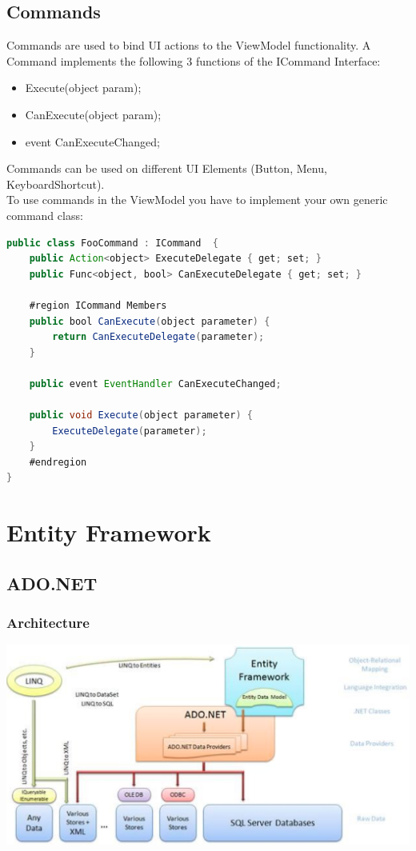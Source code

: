 \documentclass[10pt]{article}
\begin{document}
\subsection{Commands}
Commands are used to bind UI actions to the ViewModel functionality. A Command implements the following 3 functions of the ICommand Interface:
\begin{itemize}
	\item Execute(object param);
	\item CanExecute(object param);
	\item event CanExecuteChanged;
\end{itemize}
Commands can be used on different UI Elements (Button, Menu, KeyboardShortcut). \\
To use commands in the ViewModel you have to implement your own generic command class:
\begin{lstlisting}[language=Java, caption=Commands:, style=JavaStyle]
public class FooCommand : ICommand  {
	public Action<object> ExecuteDelegate { get; set; }
	public Func<object, bool> CanExecuteDelegate { get; set; }
	
	#region ICommand Members
	public bool CanExecute(object parameter) {
		return CanExecuteDelegate(parameter);
	}

	public event EventHandler CanExecuteChanged;
	
	public void Execute(object parameter) {
		ExecuteDelegate(parameter);
	}
	#endregion
}
\end{lstlisting}

\pagebreak
\section{Entity Framework}
\subsection{ADO.NET}
\subsubsection{Architecture}
\begin{center}
	\includegraphics[scale=0.3]{ado_architecture.png}
\end{center}
\end{document}
